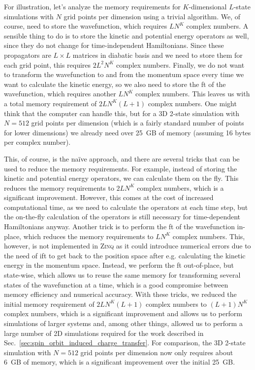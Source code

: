 For illustration, let's analyze the memory requirements for $K$-dimensional $L$-state simulations with $N$ grid points per dimension using a trivial algorithm. We, of course, need to store the wavefunction, which requires $LN^K$ complex numbers. A sensible thing to do is to store the kinetic and potential energy operators as well, since they do not change for time-independent Hamiltonians. Since these propagators are $L\times L$ matrices in diabatic basis and we need to store them for each grid point, this requires $2L^2N^K$ complex numbers. Finally, we do not want to transform the wavefunction to and from the momentum space every time we want to calculate the kinetic energy, so we also need to store the \gls{ft} of the wavefunction, which requires another $LN^K$ complex numbers. This leaves us with a total memory requirement of $2LN^K(L+1)$ complex numbers. One might think that the computer can handle this, but for a 3D 2-state simulation with $N=512$ grid points per dimension (which is a fairly standard number of points for lower dimensions) we already need over 25~GB of memory (assuming 16 bytes per complex number).

This, of course, is the na\"ive approach, and there are several tricks that can be used to reduce the memory requirements. For example, instead of storing the kinetic and potential energy operators, we can calculate them on the fly. This reduces the memory requirements to $2LN^K$ complex numbers, which is a significant improvement. However, this comes at the cost of increased computational time, as we need to calculate the operators at each time step, but the on-the-fly calculation of the operators is still necessary for time-dependent Hamiltonians anyway. Another trick is to perform the \gls{ft} of the wavefunction in-place, which reduces the memory requirements to $LN^K$ complex numbers. This, however, is not implemented in \textsc{Zinq} as it could introduce numerical errors due to the need of \gls{ift} to get back to the position space after e.g. calculating the kinetic energy in the momentum space. Instead, we perform the \gls{ft} out-of-place, but state-wise, which allows us to reuse the same memory for transforming several states of the wavefunction at a time, which is a good compromise between memory efficiency and numerical accuracy. With these tricks, we reduced the initial memory requirement of $2LN^K(L+1)$ complex numbers to $(L+1)N^K$ complex numbers, which is a significant improvement and allows us to perform simulations of larger systems and, among other things, allowed us to perform a large number of 2D simulations required for the work described in Sec.~\ref{sec:spin_orbit_induced_charge_transfer}. For comparison, the 3D 2-state simulation with $N=512$ grid points per dimension now only requires about 6~GB of memory, which is a significant improvement over the initial 25~GB.

